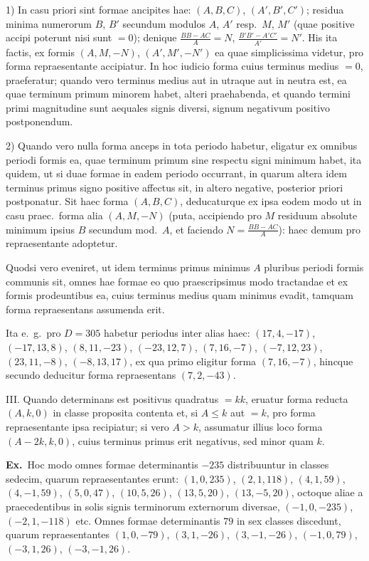 \documentclass[12pt,a4paper]{article}
\theoremstyle{plain}
\theoremstyle{definition}
\theoremstyle{remark}
\begin{document}
1) In casu priori sint formae ancipites hae: $(A,B,C)$, $(A',B',C')$; residua minima numerorum $B$, $B'$ secundum modulos $A$, $A'$ resp.\ $M$, $M'$ (quae positive accipi poterunt nisi sunt $=0$); denique $\frac{BB-AC}{A}=N$, $\frac{B'B'-A'C'}{A'}=N'$. His ita factis, ex formis $(A,M,-N)$, $(A',M',-N')$ ea quae simplicissima videtur, pro forma repraesentante accipiatur. In hoc iudicio forma cuius terminus medius $=0$, praeferatur; quando vero terminus medius aut in utraque aut in neutra est, ea quae terminum primum minorem habet, alteri praehabenda, et quando termini primi magnitudine sunt aequales signis diversi, signum negativum positivo postponendum.

2) Quando vero nulla forma anceps in tota periodo habetur, eligatur ex omnibus periodi formis ea, quae terminum primum sine respectu signi minimum habet, ita quidem, ut si duae formae in eadem periodo occurrant, in quarum altera idem terminus primus signo positive affectus sit, in altero negative, posterior priori postponatur. Sit haec forma $(A,B,C)$, deducaturque ex ipsa eodem modo ut in casu praec.\ forma alia $(A,M,-N)$ (puta, accipiendo pro $M$ residuum absolute minimum ipsius $B$ secundum mod.\ $A$, et faciendo $N=\frac{BB-AC}{A}$): haec demum pro repraesentante adoptetur.

Quodsi vero eveniret, ut idem terminus primus minimus $A$ pluribus periodi formis communis sit, omnes hae formae eo quo praescripsimus modo tractandae et ex formis prodeuntibus ea, cuius terminus medius quam minimus evadit, tamquam forma repraesentans assumenda erit.

Ita e.\ g.\ pro $D=305$ habetur periodus inter alias haec: $(17,4,-17)$, $(-17,13,8)$, $(8,11,-23)$, $(-23,12,7)$, $(7,16,-7)$, $(-7,12,23)$, $(23,11,-8)$, $(-8,13,17)$, ex qua primo eligitur forma $(7,16,-7)$, hincque secundo deducitur forma repraesentans $(7,2,-43)$.

III. Quando determinans est positivus quadratus $=kk$, eruatur forma reducta $(A,k,0)$ in classe proposita contenta et, si $A\leq k$ aut $=k$, pro forma repraesentante ipsa recipiatur; si vero $A>k$, assumatur illius loco forma $(A-2k,k,0)$, cuius terminus primus erit negativus, sed minor quam $k$.

\textbf{Ex.}\ Hoc modo omnes formae determinantis $-235$ distribuuntur in classes sedecim, quarum repraesentantes erunt: $(1,0,235)$, $(2,1,118)$, $(4,1,59)$, $(4,-1,59)$, $(5,0,47)$, $(10,5,26)$, $(13,5,20)$, $(13,-5,20)$, octoque aliae a praecedentibus in solis signis terminorum externorum diversae, $(-1,0,-235)$, $(-2,1,-118)$ etc. Omnes formae determinantis $79$ in sex classes discedunt, quarum repraesentantes $(1,0,-79)$, $(3,1,-26)$, $(3,-1,-26)$, $(-1,0,79)$, $(-3,1,26)$, $(-3,-1,26)$.
\end{document}
